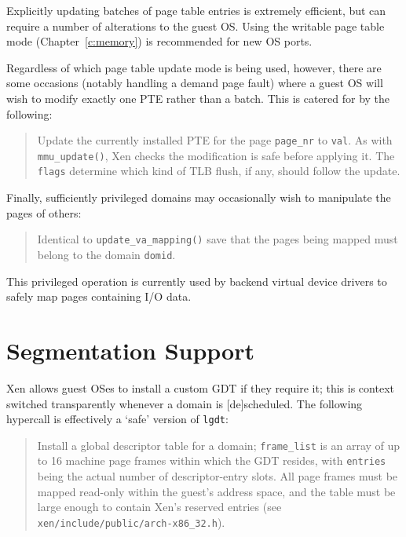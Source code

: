 \documentclass[11pt,twoside,final,openright]{xenstyle}
\begin{document}
Explicitly updating batches of page table entries is extremely
efficient, but can require a number of alterations to the guest
OS. Using the writable page table mode (Chapter~\ref{c:memory}) is
recommended for new OS ports.

Regardless of which page table update mode is being used, however,
there are some occasions (notably handling a demand page fault) where
a guest OS will wish to modify exactly one PTE rather than a
batch. This is catered for by the following:

\begin{quote} 

Update the currently installed PTE for the page {\tt page\_nr} to 
{\tt val}. As with {\tt mmu\_update()}, Xen checks the modification 
is safe before applying it. The {\tt flags} determine which kind
of TLB flush, if any, should follow the update. 

\end{quote} 

Finally, sufficiently privileged domains may occasionally wish to manipulate 
the pages of others: 
\begin{quote}


Identical to {\tt update\_va\_mapping()} save that the pages being
mapped must belong to the domain {\tt domid}. 

\end{quote}

This privileged operation is currently used by backend virtual device
drivers to safely map pages containing I/O data. 



\section{Segmentation Support}

Xen allows guest OSes to install a custom GDT if they require it; 
this is context switched transparently whenever a domain is 
[de]scheduled.  The following hypercall is effectively a 
`safe' version of {\tt lgdt}: 

\begin{quote}

Install a global descriptor table for a domain; {\tt frame\_list} is
an array of up to 16 machine page frames within which the GDT resides,
with {\tt entries} being the actual number of descriptor-entry
slots. All page frames must be mapped read-only within the guest's
address space, and the table must be large enough to contain Xen's
reserved entries (see {\tt xen/include/public/arch-x86\_32.h}).

\end{quote}
\end{document}
